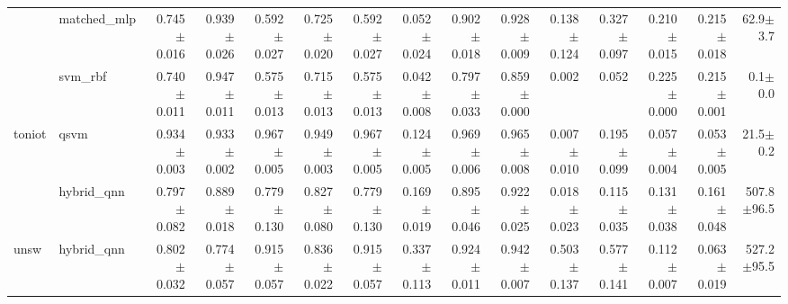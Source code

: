 \begin{table}[t]
\begin{tabular}{llrrrrrrrrrrrrr}
 & matched\_mlp & 0.745$\pm$0.016 & 0.939$\pm$0.026 & 0.592$\pm$0.027 & 0.725$\pm$0.020 & 0.592$\pm$0.027 & 0.052$\pm$0.024 & 0.902$\pm$0.018 & 0.928$\pm$0.009 & 0.138$\pm$0.124 & 0.327$\pm$0.097 & 0.210$\pm$0.015 & 0.215$\pm$0.018 & 62.9$\pm$3.7 \\
 & svm\_rbf & 0.740$\pm$0.011 & 0.947$\pm$0.011 & 0.575$\pm$0.013 & 0.715$\pm$0.013 & 0.575$\pm$0.013 & 0.042$\pm$0.008 & 0.797$\pm$0.033 & 0.859$\pm$0.000 & 0.002 & 0.052 & 0.225$\pm$0.000 & 0.215$\pm$0.001 & 0.1$\pm$0.0 \\
toniot & qsvm & 0.934$\pm$0.003 & 0.933$\pm$0.002 & 0.967$\pm$0.005 & 0.949$\pm$0.003 & 0.967$\pm$0.005 & 0.124$\pm$0.005 & 0.969$\pm$0.006 & 0.965$\pm$0.008 & 0.007$\pm$0.010 & 0.195$\pm$0.099 & 0.057$\pm$0.004 & 0.053$\pm$0.005 & 21.5$\pm$0.2 \\
 & hybrid\_qnn & 0.797$\pm$0.082 & 0.889$\pm$0.018 & 0.779$\pm$0.130 & 0.827$\pm$0.080 & 0.779$\pm$0.130 & 0.169$\pm$0.019 & 0.895$\pm$0.046 & 0.922$\pm$0.025 & 0.018$\pm$0.023 & 0.115$\pm$0.035 & 0.131$\pm$0.038 & 0.161$\pm$0.048 & 507.8$\pm$96.5 \\
unsw & hybrid\_qnn & 0.802$\pm$0.032 & 0.774$\pm$0.057 & 0.915$\pm$0.057 & 0.836$\pm$0.022 & 0.915$\pm$0.057 & 0.337$\pm$0.113 & 0.924$\pm$0.011 & 0.942$\pm$0.007 & 0.503$\pm$0.137 & 0.577$\pm$0.141 & 0.112$\pm$0.007 & 0.063$\pm$0.019 & 527.2$\pm$95.5 \\
\bottomrule
\end{tabular}
\end{table}
